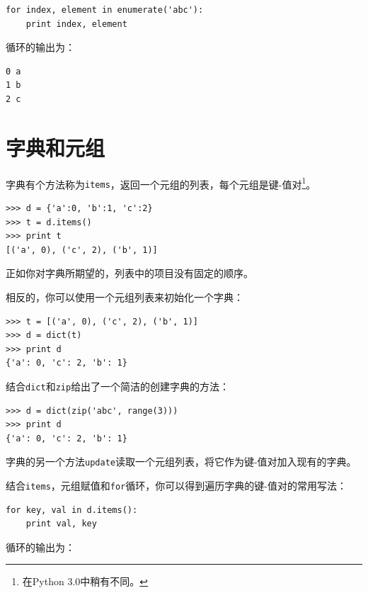 
\beforeverb
\begin{verbatim}
for index, element in enumerate('abc'):
    print index, element
\end{verbatim}
\afterverb
%
循环的输出为：

\beforeverb
\begin{verbatim}
0 a
1 b
2 c
\end{verbatim}
\afterverb
%


\section{字典和元组}


字典有个方法称为{\tt items}，返回一个元组的列表，每个元组是键-值对\footnote{在Python 3.0中稍有不同。}。

\beforeverb
\begin{verbatim}
>>> d = {'a':0, 'b':1, 'c':2}
>>> t = d.items()
>>> print t
[('a', 0), ('c', 2), ('b', 1)]
\end{verbatim}
\afterverb
%
正如你对字典所期望的，列表中的项目没有固定的顺序。


相反的，你可以使用一个元组列表来初始化一个字典：

\beforeverb
\begin{verbatim}
>>> t = [('a', 0), ('c', 2), ('b', 1)]
>>> d = dict(t)
>>> print d
{'a': 0, 'c': 2, 'b': 1}
\end{verbatim}
\afterverb

结合{\tt dict}和{\tt zip}给出了一个简洁的创建字典的方法： 


\beforeverb
\begin{verbatim}
>>> d = dict(zip('abc', range(3)))
>>> print d
{'a': 0, 'c': 2, 'b': 1}
\end{verbatim}
\afterverb
%
字典的另一个方法{\tt update}读取一个元组列表，将它作为键-值对加入现有的字典。



结合{\tt items}，元组赋值和{\tt for}循环，你可以得到遍历字典的键-值对的常用写法：

\beforeverb
\begin{verbatim}
for key, val in d.items():
    print val, key
\end{verbatim}
\afterverb
%
循环的输出为：

